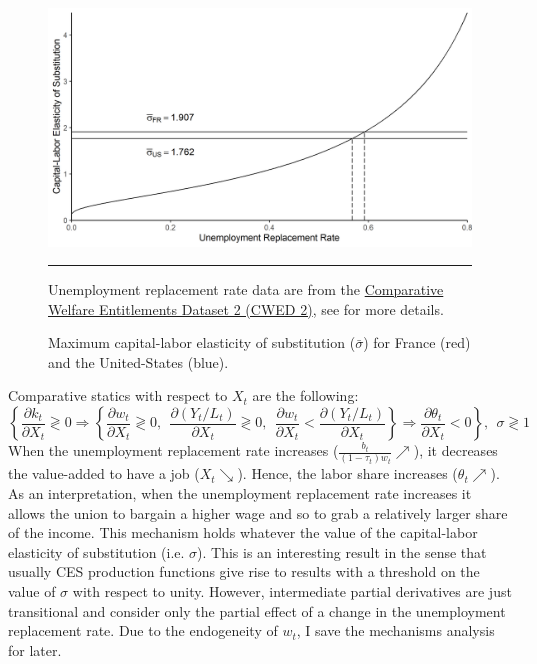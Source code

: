 \begin{figure}[tb]
	\centering
	\includegraphics[width = 1\linewidth]{../result/xsigma.png}
	\caption{Maximum capital-labor elasticity of substitution ($\bar{\sigma}$) for France (red) and the United-States (blue).}
	\label{fig:xsigma}
	\vspace{.5ex}
	\hrule
	\vspace{-4ex}
	\justify\singlespacing\footnotesize Unemployment replacement rate data are from the \href{http://cwed2.org/}{Comparative Welfare Entitlements Dataset 2 (CWED 2)}, see \cite{CWED2017} for more details.
\end{figure}
Comparative statics with respect to $X_t$ are the following:
\begin{equation*}
\left\lbrace \frac{\partial k_t}{\partial X_t} \gtrless 0 \Rightarrow 
\left\lbrace \frac{\partial w_t}{\partial X_t} \gtrless 0,~~
\frac{\partial (Y_t/L_t)}{\partial X_t} \gtrless 0,~~ \frac{\partial w_t}{\partial X_t} <
\frac{\partial (Y_t/L_t)}{\partial X_t} \right\rbrace \Rightarrow 
\frac{\partial \theta_t}{\partial X_t} < 0
\right\rbrace, ~~ \sigma \gtrless 1
\end{equation*}
When the unemployment replacement rate increases ($\frac{b_t}{(1-\tau_t)w_t} \nearrow$), it decreases the value-added to have a job ($X_t \searrow$). Hence, the labor share increases ($\theta_t \nearrow$). As an interpretation, when the unemployment replacement rate increases it allows the union to bargain a higher wage and so to grab a relatively larger share of the income. This mechanism holds whatever the value of the capital-labor elasticity of substitution (i.e. $\sigma$). This is an interesting result in the sense that usually CES production functions give rise to results with a threshold on the value of $\sigma$ with respect to unity. However, intermediate partial derivatives are just transitional and consider only the partial effect of a change in the unemployment replacement rate. Due to the endogeneity of $w_t$, I save the mechanisms analysis for later. 

